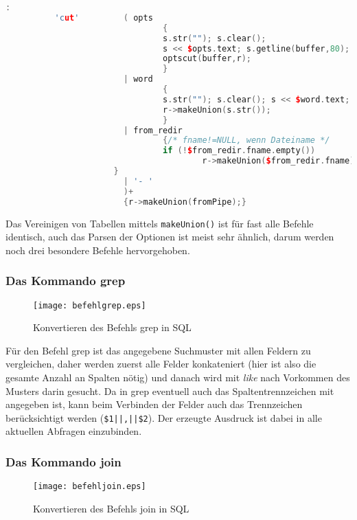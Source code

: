 \begin{lstlisting}[language=C++]
        :
          'cut'         ( opts
                                {
                                s.str(""); s.clear();
                                s << $opts.text; s.getline(buffer,80);
                                optscut(buffer,r);
                                }
                        | word
                                {
                                s.str(""); s.clear(); s << $word.text;
                                r->makeUnion(s.str());
                                }
                        | from_redir
                                {/* fname!=NULL, wenn Dateiname */
                                if (!$from_redir.fname.empty())
                                        r->makeUnion($from_redir.fname);
			          }
                        | '- '
                        )+
                        {r->makeUnion(fromPipe);}
\end{lstlisting}

Das Vereinigen von Tabellen mittels \lstinline{makeUnion()} ist für fast alle Befehle identisch, auch das Parsen der Optionen ist meist sehr ähnlich, darum werden noch drei besondere Befehle hervorgehoben.

\subsubsection{Das Kommando grep}

\begin{figure}[h]
\centering
\texttt{[image: befehlgrep.eps]}
\caption{Konvertieren des Befehls grep in SQL}
\label{fig:grep}
\end{figure}

Für den Befehl grep ist das angegebene Suchmuster mit allen Feldern zu vergleichen, daher werden zuerst alle Felder konkateniert (hier ist also die gesamte Anzahl an Spalten nötig) und danach wird mit \textit{like} nach Vorkommen des Musters darin gesucht. Da in grep eventuell auch das Spaltentrennzeichen mit angegeben ist, kann beim Verbinden der Felder auch das Trennzeichen berücksichtigt werden (\lstinline{$1||,||$2}).
Der erzeugte Ausdruck ist dabei in alle aktuellen Abfragen einzubinden.

\subsubsection{Das Kommando join}

\begin{figure}[h]
\centering
\texttt{[image: befehljoin.eps]}
\caption{Konvertieren des Befehls join in SQL}
\label{fig:join}
\end{figure}

